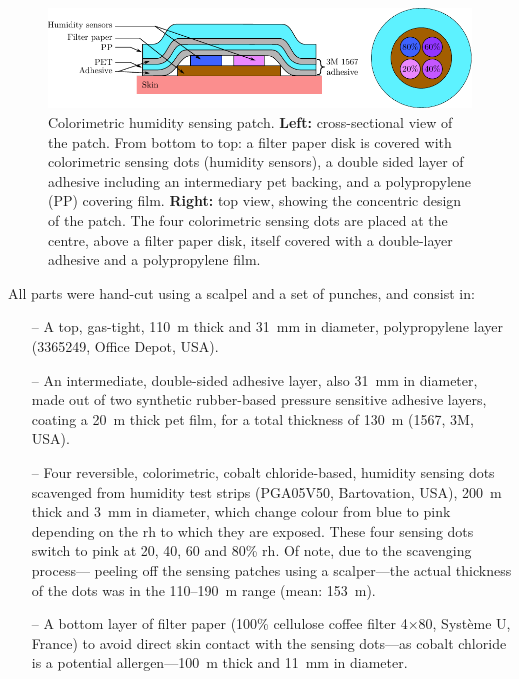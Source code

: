 \begin{figure}
	\centering
	\includegraphics{1_main_matter/tcco2_figures/humid_patch_schem.pdf}
	\caption[Colorimetric humidity sensing patch schematic.]{Colorimetric humidity sensing patch. \textbf{Left:} cross-sectional view of the patch. From bottom to top: a filter paper disk is covered with colorimetric sensing dots (humidity sensors), a double sided layer of adhesive including an intermediary \gls{pet} backing, and a polypropylene (PP) covering film. \textbf{Right:} top view, showing the concentric design of the patch. The four colorimetric sensing dots are placed at the centre, above a filter paper disk, itself covered with a double-layer adhesive and a polypropylene film.}
	\label{fig:tcco2:humid_principle}
\end{figure}

All parts were hand-cut using a scalpel and a set of punches, and consist in:
\begin{itemize}
	\item[--] A top, gas-tight, 110~{\textmu}m thick and 31~mm in diameter, polypropylene layer (3365249, Office Depot, USA).
	\item[--] An intermediate, double-sided adhesive layer, also 31~mm in diameter, made out of two synthetic rubber-based pressure sensitive adhesive layers, coating a 20~{\textmu}m thick \gls{pet} film, for a total thickness of 130~{\textmu}m (1567, 3M, USA).
	\item[--] Four reversible, colorimetric, cobalt chloride-based, humidity sensing dots scavenged from humidity test strips (PGA05V50, Bartovation, USA), 200~{\textmu}m thick and 3~mm in diameter, which change colour from blue to pink depending on the \gls{rh} to which they are exposed. These four sensing dots switch to pink at 20, 40, 60 and 80\% \gls{rh}. Of note, due to the scavenging process---\ie{} peeling off the sensing patches using a scalper---the actual thickness of the dots was in the 110--190~{\textmu}m range (mean: 153~{\textmu}m).
	\item[--] A bottom layer of filter paper (100\% cellulose coffee filter {\textnumero}4$\times$80, Système U, France) to avoid direct skin contact with the sensing dots---as cobalt chloride is a potential allergen\cite{zug2009, thyssen2012}---100~{\textmu}m thick and 11~mm in diameter.
\end{itemize}

